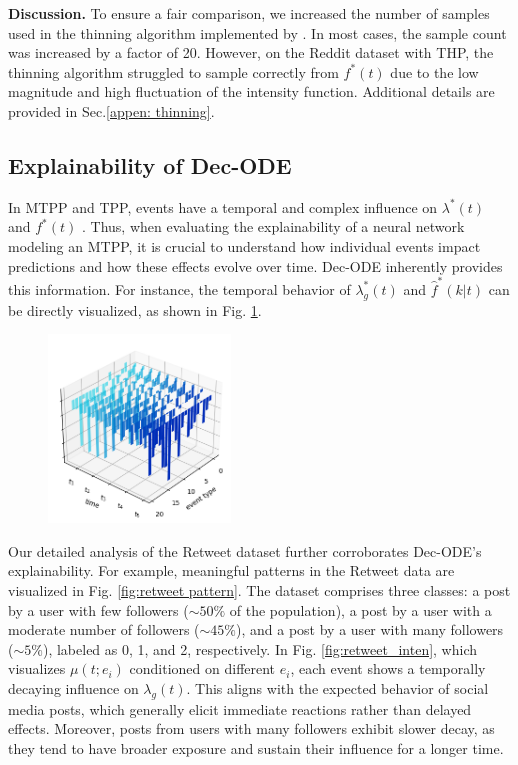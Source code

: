 \textbf{Discussion.}  
To ensure a fair comparison, we increased the number of samples used in the thinning algorithm \cite{lec:thinning, bib:thinning_ogata} implemented by \cite{bib:ANHP}. In most cases, the sample count was increased by a factor of 20. However, on the Reddit dataset with THP, the thinning algorithm struggled to sample correctly from $f^*(t)$ due to the low magnitude and high fluctuation of the intensity function. Additional details are provided in Sec.\ref{appen: thinning}.

\subsection{Explainability of Dec-ODE\label{exp: explainability}}

In MTPP and TPP, events have a temporal and complex influence on $\lambda^*(t)$ and $f^*(t)$ \cite{bib:hawkesOrigin, ISHAM1979335}.  
Thus, when evaluating the explainability of a neural network modeling an MTPP, it is crucial to understand how individual events impact predictions and how these effects evolve over time.  
Dec-ODE inherently provides this information.  
For instance, the temporal behavior of $\lambda_g^*(t)$ and $\hat{f}^*(k|t)$ can be directly visualized, as shown in Fig. \ref{fig: so fk}.

\begin{figure}
    \includegraphics[width=0.92\linewidth, height=5cm]{figure/fk_dynamic.png}
    \captionsetup[figure]{font=small, justification=justified, margin=0.1cm}
    \label{fig: so fk}
\end{figure}

Our detailed analysis of the Retweet dataset further corroborates Dec-ODE's explainability.  
For example, meaningful patterns in the Retweet data are visualized in Fig. \ref{fig:retweet pattern}.  
The dataset comprises three classes:  
a post by a user with few followers ($\sim50\%$ of the population),  
a post by a user with a moderate number of followers ($\sim45\%$),  
and a post by a user with many followers ($\sim5\%$), labeled as 0, 1, and 2, respectively.  
In Fig. \ref{fig:retweet_inten}, which visualizes $\mu(t; e_i)$ conditioned on different $e_i$, each event shows a temporally decaying influence on $\lambda_g(t)$.  
This aligns with the expected behavior of social media posts, which generally elicit immediate reactions rather than delayed effects. 
Moreover, posts from users with many followers exhibit slower decay, as they tend to have broader exposure and sustain their influence for a longer time.

